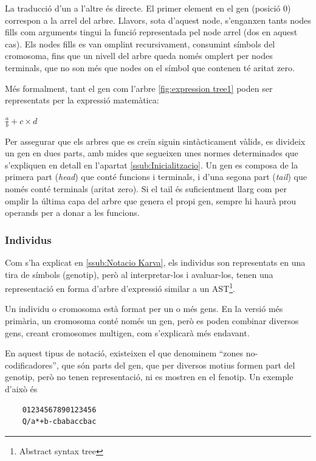 La traducció d'un a l'altre és directe.  El primer element en el gen (posició
0) correspon a la arrel del arbre.  Llavors, sota d'aquest node, s'enganxen
tants nodes fills com arguments tingui la funció representada pel node arrel
(dos en aquest cas). Els nodes fills es van omplint recursivament, consumint
símbols del cromosoma, fins que un nivell del arbre queda només omplert per
nodes terminals, que no son més que nodes on el símbol que contenen té aritat
zero.

Més formalment, tant el gen com l'arbre \ref{fig:expression tree1} poden ser
representats per la expressió matemàtica:

	$\frac{a}{b}+c \times d$

Per assegurar que els arbres que es creïn siguin sintàcticament vàlids, es
divideix un gen en dues parts, amb mides que segueixen unes normes determinades
que s'expliquen en detall en l'apartat \ref{ssub:Inicialitzacio}.  Un gen es
composa de la primera part (\emph{head}) que conté funcions i terminals, i d'una
segona part (\emph{tail}) que només conté terminals (aritat zero). Si el tail és
suficientment llarg com per omplir la última capa del arbre que genera el propi
gen, sempre hi haurà prou operands per a donar a les funcions.


\subsubsection{Individus} %
\label{issub:individus}

Com s'ha explicat en \ref{ssub:Notacio Karva}, els individus son representats en
una tira de símbols (genotip), però al interpretar-los i avaluar-los, tenen una
representació en forma d'arbre d'expressió similar a un AST\footnote{Abstract
syntax tree}.

Un individu o cromosoma està format per un o més gens.  En la versió més
primària, un cromosoma conté només un gen, però es poden combinar diversos gens,
creant cromosomes multigen, com s'explicarà més endavant.

En aquest tipus de notació, existeixen el que denominem ``zones
no-codificadores'', que són parts del gen, que per diversos motius formen part
del genotip, però no tenen representació, ni es mostren en el fenotip.  Un
exemple d'això és


\begin{verbatim}
	01234567890123456 	 
	Q/a*+b-cbabaccbac
\end{verbatim}

